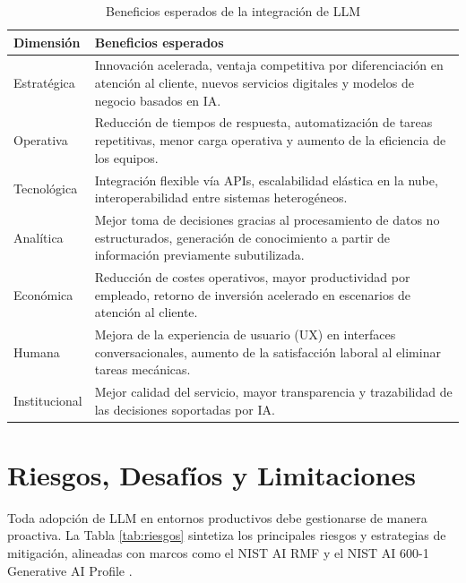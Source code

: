 \documentclass[12pt,a4paper,oneside]{article}
\begin{document}
\begin{table}[h!]
\centering
\caption{Beneficios esperados de la integración de LLM}
\label{tab:beneficios}
\begin{tabular}{p{3.5cm} p{11cm}}
\toprule
\textbf{Dimensión} & \textbf{Beneficios esperados} \\
\midrule
Estratégica & Innovación acelerada, ventaja competitiva por diferenciación en atención al cliente, nuevos servicios digitales y modelos de negocio basados en IA. \\
Operativa & Reducción de tiempos de respuesta, automatización de tareas repetitivas, menor carga operativa y aumento de la eficiencia de los equipos. \\
Tecnológica & Integración flexible vía APIs, escalabilidad elástica en la nube, interoperabilidad entre sistemas heterogéneos. \\
Analítica & Mejor toma de decisiones gracias al procesamiento de datos no estructurados, generación de conocimiento a partir de información previamente subutilizada. \\
Económica & Reducción de costes operativos, mayor productividad por empleado, retorno de inversión acelerado en escenarios de atención al cliente. \\
Humana & Mejora de la experiencia de usuario (UX) en interfaces conversacionales, aumento de la satisfacción laboral al eliminar tareas mecánicas. \\
Institucional & Mejor calidad del servicio, mayor transparencia y trazabilidad de las decisiones soportadas por IA. \\
\bottomrule
\end{tabular}
\end{table}

\section{Riesgos, Desafíos y Limitaciones}

Toda adopción de LLM en entornos productivos debe gestionarse de manera proactiva. La Tabla \ref{tab:riesgos} sintetiza los principales riesgos y estrategias de mitigación, alineadas con marcos como el NIST AI RMF \cite{nistAIRMF2023} y el NIST AI 600-1 Generative AI Profile \cite{nistGenAI2024}.
\end{document}

